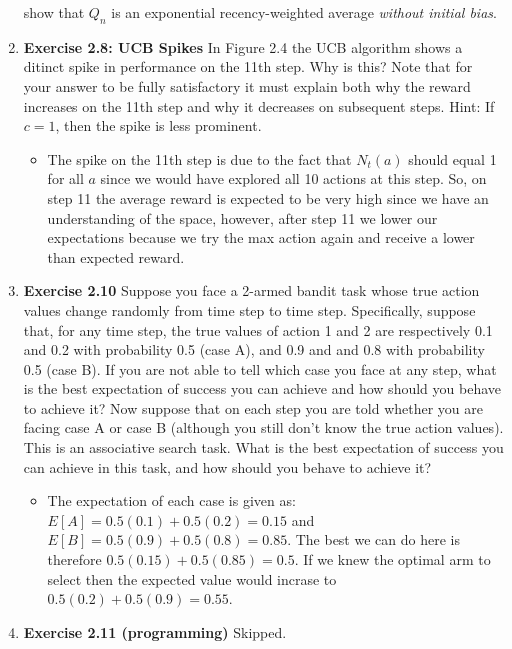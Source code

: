 \documentclass[12pt]{article}
\begin{document}
\begin{enumerate}[label=(\alph*)]
  show that $Q_n$ is an exponential recency-weighted average \textit{without initial bias}.
  \item \textbf{Exercise 2.8: UCB Spikes} In Figure 2.4 the UCB algorithm shows a ditinct spike in performance on the 11th step. Why is this? Note
  that for your answer to be fully satisfactory it must explain both why the reward increases on the 11th step and why it decreases on subsequent
  steps. Hint: If $c = 1$, then the spike is less prominent. 
  \begin{itemize}
    \item The spike on the 11th step is due to the fact that $N_t(a)$ should equal 1 for all $a$ since we would have explored all 10 actions
    at this step. So, on step 11 the average reward is expected to be very high since we have an understanding of the space, however, after 
    step 11 we lower our expectations because we try the max action again and receive a lower than expected reward.
  \end{itemize}
  \item \textbf{Exercise 2.10} Suppose you face a 2-armed bandit task whose true action values change randomly from time step to time step.
  Specifically, suppose that, for any time step, the true values of action 1 and 2 are respectively 0.1 and 0.2 with probability 0.5
  (case A), and 0.9 and and 0.8 with probability 0.5 (case B). If you are not able to tell which case you face at any step, what is the best
  expectation of success you can achieve and how should you behave to achieve it? Now suppose that on each step you are told whether you are
  facing case A or case B (although you still don't know the true action values). This is an associative search task. What is the best
  expectation of success you can achieve in this task, and how should you behave to achieve it?
  \begin{itemize}
    \item The expectation of each case is given as: $E[A] = 0.5(0.1) + 0.5(0.2) = 0.15$ and $E[B] = 0.5(0.9) + 0.5(0.8) = 0.85$. The best
    we can do here is therefore $0.5(0.15) + 0.5(0.85) = 0.5$. If we knew the optimal arm to select then the expected value would incrase to 
    $0.5(0.2) + 0.5(0.9) = 0.55$.
  \end{itemize}
  \item \textbf{Exercise 2.11 (programming)} Skipped.
  

\end{enumerate}
\end{document}
